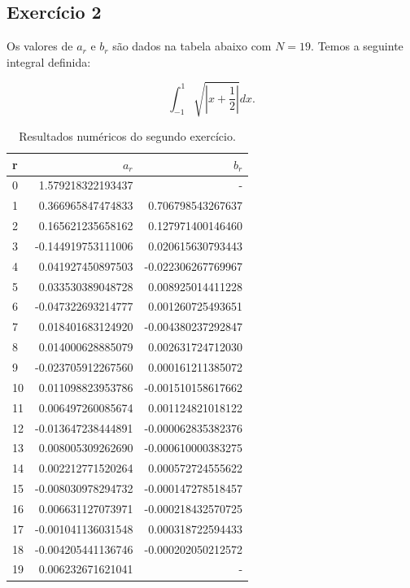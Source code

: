 \documentclass[10pt,a4paper]{article}
\begin{document}
    \newpage
    \subsection{Exercício 2}
    
    Os valores de $a_r$ e $b_r$ são dados na tabela abaixo com $N=19$. Temos a seguinte integral definida:
    
    \[\int_{-1}^1 \sqrt{\left|x+\frac{1}{2}\right|} dx.\]
   
    
    \begin{table}[h]
    \centering
    \caption{Resultados numéricos do segundo exercício.}
    \label{my-label}
    \begin{tabular}{lrr}
\hline
 r   &   $a_r$               & $b_r$\\
 \hline
 0   &   1.579218322193437   &   -  \\
 1   &   0.366965847474833   &   0.706798543267637  \\
 2   &   0.165621235658162   &   0.127971400146460  \\
 3   &  -0.144919753111006   &   0.020615630793443  \\
 4   &   0.041927450897503   &  -0.022306267769967  \\
 5   &   0.033530389048728   &   0.008925014411228  \\
 6   &  -0.047322693214777   &   0.001260725493651  \\
 7   &   0.018401683124920   &  -0.004380237292847  \\
 8   &   0.014000628885079   &   0.002631724712030  \\
 9   &  -0.023705912267560   &   0.000161211385072  \\
10   &   0.011098823953786   &  -0.001510158617662  \\
11   &   0.006497260085674   &   0.001124821018122  \\
12   &  -0.013647238444891   &  -0.000062835382376  \\
13   &   0.008005309262690   &  -0.000610000383275  \\
14   &   0.002212771520264   &   0.000572724555622  \\
15   &  -0.008030978294732   &  -0.000147278518457  \\
16   &   0.006631127073971   &  -0.000218432570725  \\
17   &  -0.001041136031548   &   0.000318722594433  \\
18   &  -0.004205441136746   &  -0.000202050212572  \\
19   &   0.006232671621041   &  -  \\
\hline
    \end{tabular}
    \end{table}
    
\end{document}
